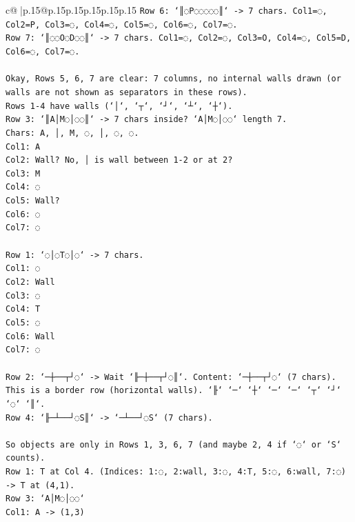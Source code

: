 \documentclass{article}
\begin{document}
{\begin{supertabular}{c@{$\;$}|p{.15\linewidth}@{}p{.15\linewidth}p{.15\linewidth}p{.15\linewidth}p{.15\linewidth}p{.15\linewidth}}
{{{\texttt{Row 6: `║◌P◌◌◌◌◌║` {-}> 7 chars. Col1=◌, Col2=P, Col3=◌, Col4=◌, Col5=◌, Col6=◌, Col7=◌.} \\
\texttt{Row 7: `║◌◌O◌D◌◌║` {-}> 7 chars. Col1=◌, Col2=◌, Col3=O, Col4=◌, Col5=D, Col6=◌, Col7=◌.} \\
\\ 
\texttt{Okay, Rows 5, 6, 7 are clear: 7 columns, no internal walls drawn (or walls are not shown as separators in these rows).} \\
\texttt{Rows 1{-}4 have walls (`│`, `┬`, `┘`, `┴`, `┼`).} \\
\texttt{Row 3: `║A│M◌│◌◌║` {-}> 7 chars inside? `A│M◌│◌◌` length 7.} \\
\texttt{Chars: A, │, M, ◌, │, ◌, ◌.} \\
\texttt{Col1: A} \\
\texttt{Col2: Wall? No, │ is wall between 1{-}2 or at 2?} \\
\texttt{Col3: M} \\
\texttt{Col4: ◌} \\
\texttt{Col5: Wall?} \\
\texttt{Col6: ◌} \\
\texttt{Col7: ◌} \\
\\ 
\texttt{Row 1: `◌│◌T◌│◌` {-}> 7 chars.} \\
\texttt{Col1: ◌} \\
\texttt{Col2: Wall} \\
\texttt{Col3: ◌} \\
\texttt{Col4: T} \\
\texttt{Col5: ◌} \\
\texttt{Col6: Wall} \\
\texttt{Col7: ◌} \\
\\ 
\texttt{Row 2: `─┼──┬┘◌` {-}> Wait `╟─┼──┬┘◌║`. Content: `─┼──┬┘◌` (7 chars).} \\
\texttt{This is a border row (horizontal walls). `╟` `─` `┼` `─` `─` `┬` `┘` `◌` `║`.} \\
\texttt{Row 4: `╟─┴──┘◌S║` {-}> `─┴──┘◌S` (7 chars).} \\
\\ 
\texttt{So objects are only in Rows 1, 3, 6, 7 (and maybe 2, 4 if `◌` or `S` counts).} \\
\texttt{Row 1: T at Col 4. (Indices: 1:◌, 2:wall, 3:◌, 4:T, 5:◌, 6:wall, 7:◌) {-}> T at (4,1).} \\
\texttt{Row 3: `A│M◌│◌◌`} \\
\texttt{Col1: A {-}> (1,3)} \\
}}}
\end{supertabular}}
\end{document}
